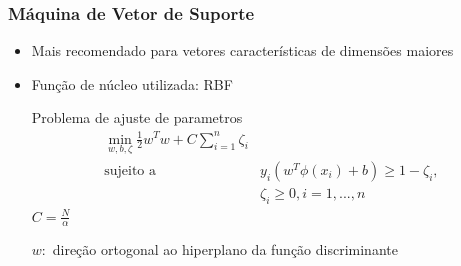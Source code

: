 \documentclass{beamer}
\begin{document}
\begin{frame}
\frametitle{Máquina de Vetor de Suporte}
\begin{itemize}
\item Mais recomendado para vetores características de dimensões maiores
\item Função de núcleo utilizada: RBF
\begin{block}{Problema de ajuste de parametros}
\begin{align*}
\min_ {w, b, \zeta} \frac{1}{2} w^T w + C \sum_{i=1}^{n} \zeta_i \\
\textrm {sujeito a } & y_i (w^T \phi (x_i) + b) \geq 1 - \zeta_i,\\
& \zeta_i \geq 0, i=1, ..., n
\end{align*}
$C = \frac{N}{\alpha}$

$w:$ direção ortogonal ao hiperplano da função discriminante
\end{block}
\end{itemize}
\end{frame}
\end{document}
